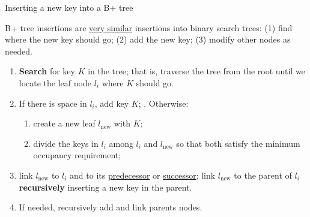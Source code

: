 %
%
\begin{frame}{Inserting a new key into a B+ tree}

B+ tree insertions are \underline{very similar} insertions into binary search trees: (1) find where the new key should go; (2) add the new key; (3) modify other nodes as needed.

\small
\begin{enumerate}[label=(\arabic*)]
\item \textbf{Search} for key \alert{$K$} in the tree; that is, traverse the tree from the root until we locate the leaf node \alert{$l_i$} where \alert{$K$} should go.

\item If there is space in \alert{$l_i$}, add key \alert{$K$}; . Otherwise:
\begin{enumerate}[label=(\alph*)]
\item create a new leaf \alert{$l_{\text{new}}$} with \alert{$K$};
\item divide the keys in \alert{$l_i$} among \alert{$l_i$} and \alert{$l_{\text{new}}$} so that both satisfy the minimum occupancy requirement; 
\end{enumerate}
\item link \alert{$l_{\text{new}}$} to \alert{$l_i$} and to its \underline{predecessor} or \underline{successor}; link \alert{$l_{\text{new}}$} to the parent of \alert{$l_i$} \textbf{recursively} inserting a new key in the parent.
\item If needed, recursively add and link parents nodes.
\end{enumerate}
\end{frame}

\normalsize

